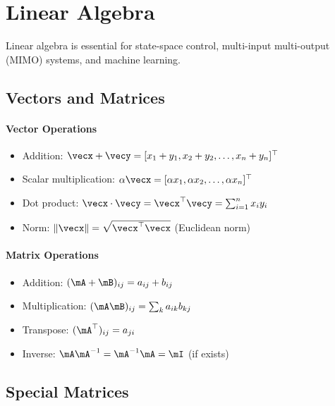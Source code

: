 

\chapter{Linear Algebra}
\label{ch:linear_algebra}

Linear algebra is essential for state-space control, multi-input multi-output (MIMO) systems, and machine learning.

\section{Vectors and Matrices}

\subsubsection{Vector Operations}
\begin{itemize}
    \item Addition: $\vecx + \vecy = [x_1+y_1, x_2+y_2, \ldots, x_n+y_n]^\top$
    \item Scalar multiplication: $\alpha\vecx = [\alpha x_1, \alpha x_2, \ldots, \alpha x_n]^\top$
    \item Dot product: $\vecx \cdot \vecy = \vecx^\top\vecy = \sum_{i=1}^n x_i y_i$
    \item Norm: $\|\vecx\| = \sqrt{\vecx^\top\vecx}$ (Euclidean norm)
\end{itemize}

\subsubsection{Matrix Operations}
\begin{itemize}
    \item Addition: $(\mA + \mB)_{ij} = a_{ij} + b_{ij}$
    \item Multiplication: $(\mA\mB)_{ij} = \sum_k a_{ik}b_{kj}$
    \item Transpose: $(\mA^\top)_{ij} = a_{ji}$
    \item Inverse: $\mA\mA^{-1} = \mA^{-1}\mA = \mI$ (if exists)
\end{itemize}

\section{Special Matrices}

